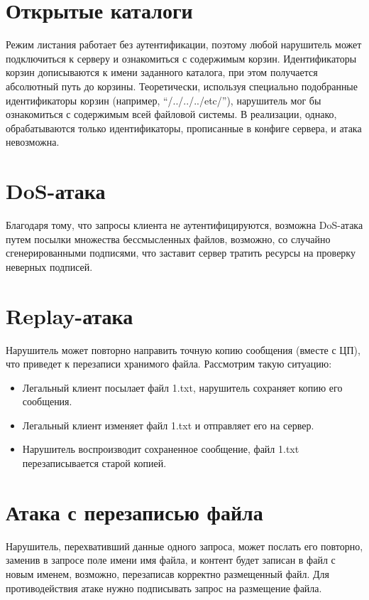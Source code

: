 \documentclass[a4paper,12pt]{article}
\begin{document}
\section{Открытые каталоги}

Режим листания работает без аутентификации, поэтому любой нарушитель может подключиться к серверу и ознакомиться с содержимым корзин.
Идентификаторы корзин дописываются к имени заданного каталога, при этом получается абсолютный путь до корзины. 
Теоретически, используя специально подобранные идентификаторы корзин (например, ``/../../../etc/''), нарушитель мог бы ознакомиться с содержимым всей файловой системы. В реализации, однако, обрабатываются только идентификаторы, прописанные в конфиге сервера, и атака невозможна.

\section{DoS-атака}

Благодаря тому, что запросы клиента не аутентифицируются, возможна DoS-атака путем посылки множества бессмысленных файлов, возможно, со случайно сгенерированными подписями, что заставит сервер тратить ресурсы на проверку неверных подписей.

\section{Replay-атака}

Нарушитель может повторно направить точную копию сообщения (вместе с ЦП), что приведет к перезаписи хранимого файла. Рассмотрим такую ситуацию:
\begin{itemize}
 \item Легальный клиент посылает файл 1.txt, нарушитель сохраняет копию его сообщения.
 \item Легальный клиент изменяет файл 1.txt и отправляет его на сервер.
 \item Нарушитель воспроизводит сохраненное сообщение, файл 1.txt перезаписывается старой копией.
\end{itemize}

\section{Атака с перезаписью файла} 

Нарушитель, перехвативший данные одного запроса, может послать его повторно, заменив  в запросе поле имени имя файла, и контент будет записан в файл с новым именем, возможно, перезаписав корректно размещенный файл. Для противодействия атаке нужно подписывать запрос на размещение файла.
\end{document}
